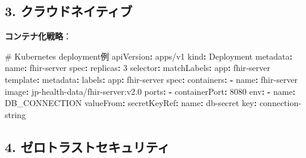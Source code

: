 \documentclass[
  a4paper,
  a4paper,
  11pt]{ltjsbook}
\newenvironment{Shaded}{\begin{snugshade}}{\end{snugshade}}
\newcommand{\AttributeTok}[1]{\textcolor[rgb]{0.40,0.45,0.13}{#1}}
\newcommand{\CommentTok}[1]{\textcolor[rgb]{0.37,0.37,0.37}{#1}}
\newcommand{\DecValTok}[1]{\textcolor[rgb]{0.68,0.00,0.00}{#1}}
\newcommand{\FunctionTok}[1]{\textcolor[rgb]{0.28,0.35,0.67}{#1}}
\newcommand{\KeywordTok}[1]{\textcolor[rgb]{0.00,0.23,0.31}{\textbf{#1}}}
\begin{document}
\subsection{3.
クラウドネイティブ}\label{ux30afux30e9ux30a6ux30c9ux30cdux30a4ux30c6ux30a3ux30d6}

\textbf{コンテナ化戦略}：

\begin{Shaded}
\begin{Highlighting}[]
\CommentTok{\# Kubernetes deployment例}
\FunctionTok{apiVersion}\KeywordTok{:}\AttributeTok{ apps/v1}
\FunctionTok{kind}\KeywordTok{:}\AttributeTok{ Deployment}
\FunctionTok{metadata}\KeywordTok{:}
\AttributeTok{  }\FunctionTok{name}\KeywordTok{:}\AttributeTok{ fhir{-}server}
\FunctionTok{spec}\KeywordTok{:}
\AttributeTok{  }\FunctionTok{replicas}\KeywordTok{:}\AttributeTok{ }\DecValTok{3}
\AttributeTok{  }\FunctionTok{selector}\KeywordTok{:}
\AttributeTok{    }\FunctionTok{matchLabels}\KeywordTok{:}
\AttributeTok{      }\FunctionTok{app}\KeywordTok{:}\AttributeTok{ fhir{-}server}
\AttributeTok{  }\FunctionTok{template}\KeywordTok{:}
\AttributeTok{    }\FunctionTok{metadata}\KeywordTok{:}
\AttributeTok{      }\FunctionTok{labels}\KeywordTok{:}
\AttributeTok{        }\FunctionTok{app}\KeywordTok{:}\AttributeTok{ fhir{-}server}
\AttributeTok{    }\FunctionTok{spec}\KeywordTok{:}
\AttributeTok{      }\FunctionTok{containers}\KeywordTok{:}
\AttributeTok{      }\KeywordTok{{-}}\AttributeTok{ }\FunctionTok{name}\KeywordTok{:}\AttributeTok{ fhir{-}server}
\AttributeTok{        }\FunctionTok{image}\KeywordTok{:}\AttributeTok{ jp{-}health{-}data/fhir{-}server:v2.0}
\AttributeTok{        }\FunctionTok{ports}\KeywordTok{:}
\AttributeTok{        }\KeywordTok{{-}}\AttributeTok{ }\FunctionTok{containerPort}\KeywordTok{:}\AttributeTok{ }\DecValTok{8080}
\AttributeTok{        }\FunctionTok{env}\KeywordTok{:}
\AttributeTok{        }\KeywordTok{{-}}\AttributeTok{ }\FunctionTok{name}\KeywordTok{:}\AttributeTok{ DB\_CONNECTION}
\AttributeTok{          }\FunctionTok{valueFrom}\KeywordTok{:}
\AttributeTok{            }\FunctionTok{secretKeyRef}\KeywordTok{:}
\AttributeTok{              }\FunctionTok{name}\KeywordTok{:}\AttributeTok{ db{-}secret}
\AttributeTok{              }\FunctionTok{key}\KeywordTok{:}\AttributeTok{ connection{-}string}
\end{Highlighting}
\end{Shaded}

\subsection{4.
ゼロトラストセキュリティ}\label{ux30bcux30edux30c8ux30e9ux30b9ux30c8ux30bbux30adux30e5ux30eaux30c6ux30a3}
\end{document}
